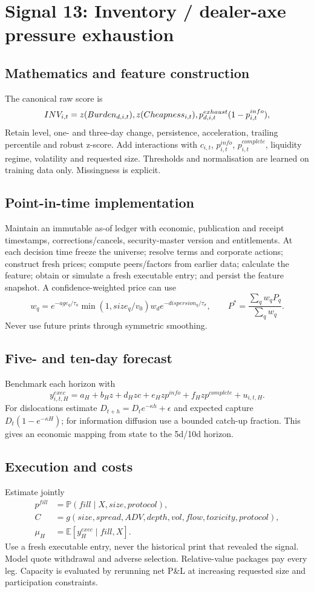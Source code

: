 \documentclass[10pt]{article}
\newcommand{\E}{\mathbb{E}}\newcommand{\Pp}{\mathbb{P}}
\begin{document}
\section{Signal 13: Inventory / dealer-axe pressure exhaustion}
\subsection{Mathematics and feature construction}
The canonical raw score is
\begin{equation}INV_{i,t}=z(Burden_{d,i,t})\\,z(Cheapness_{i,t})\\,p^{exhaust}_{d,i,t}(1-p^{info}_{i,t}),\end{equation}
Retain level, one- and three-day change, persistence, acceleration, trailing percentile and robust z-score. Add interactions with $c_{i,t}$, $p^{info}_{i,t}$, $p^{complete}_{i,t}$, liquidity regime, volatility and requested size. Thresholds and normalisation are learned on training data only. Missingness is explicit.

\subsection{Point-in-time implementation}
Maintain an immutable as-of ledger with economic, publication and receipt timestamps, corrections/cancels, security-master version and entitlements. At each decision time freeze the universe; resolve terms and corporate actions; construct fresh prices; compute peers/factors from earlier data; calculate the feature; obtain or simulate a fresh executable entry; and persist the feature snapshot. A confidence-weighted price can use
\[w_q=e^{-age_q/\tau_a}\min(1,size_q/v_0)w_d e^{-dispersion_q/\tau_\sigma},\qquad P^*=\frac{\sum_qw_qP_q}{\sum_qw_q}.\]
Never use future prints through symmetric smoothing.

\subsection{Five- and ten-day forecast}
Benchmark each horizon with
\[y^{exec}_{i,t,H}=a_H+b_Hz+d_Hzc+e_Hzp^{info}+f_Hzp^{complete}+u_{i,t,H}.\]
For dislocations estimate $D_{t+h}=D_te^{-\kappa h}+\epsilon$ and expected capture $D_t(1-e^{-\kappa H})$; for information diffusion use a bounded catch-up fraction. This gives an economic mapping from state to the 5d/10d horizon.

\subsection{Execution and costs}
Estimate jointly
\begin{align}
p^{fill}&=\Pp(fill\mid X,size,protocol),\\
C&=g(size,spread,ADV,depth,vol,flow,toxicity,protocol),\\
\mu_H&=\E[y^{exec}_H\mid fill,X].
\end{align}
Use a fresh executable entry, never the historical print that revealed the signal. Model quote withdrawal and adverse selection. Relative-value packages pay every leg. Capacity is evaluated by rerunning net P\&L at increasing requested size and participation constraints.
\end{document}
